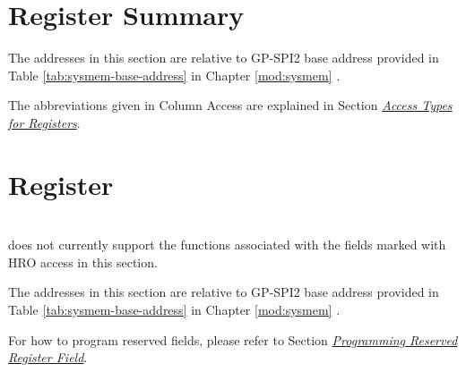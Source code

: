 \documentclass[main\_\_EN.tex]{subfiles}
\begin{document}
\hypertarget{spi-reg-summ}{}
\section{Register Summary}
\label{sec:spi2-reg-summ}

The addresses in this section are relative to GP-SPI2 base address provided in Table \ref{tab:sysmem-base-address} in Chapter \ref{mod:sysmem} \textit{}.

The abbreviations given in Column Access are explained in Section \hyperref[glossary-access-types]{\textit{Access Types for Registers}}.



\section{Register}

\begin{importantlisting}\\
\chipname{} does not currently support the functions associated with the fields marked with HRO access in this section.
\end{importantlisting}

The addresses in this section are relative to GP-SPI2 base address provided in Table \ref{tab:sysmem-base-address} in Chapter \ref{mod:sysmem} \textit{}.

For how to program reserved fields, please refer to Section \hyperref[programming-reserved-field]{\textit{Programming Reserved Register Field}}.


\end{document}
